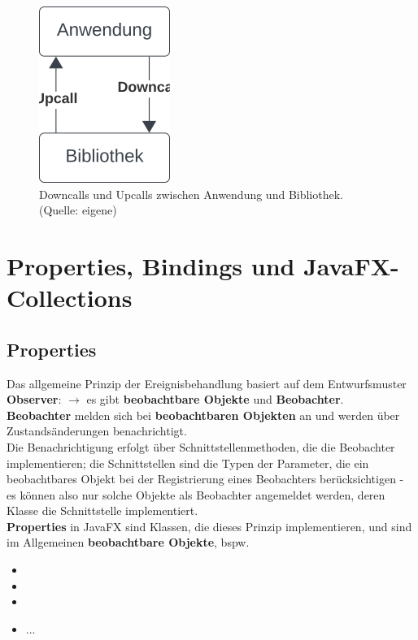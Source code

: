 \begin{figure}
    \centering
    \includegraphics[scale=0.5]{chapters/fopt3/img/javafx/downcallupcall}
    \caption{Downcalls und Upcalls zwischen Anwendung und Bibliothek. (Quelle: eigene)}
    \label{fig:downcallupcall}
\end{figure}

\section{Properties, Bindings und JavaFX-Collections}

\subsection{Properties}

Das allgemeine Prinzip der Ereignisbehandlung basiert auf dem Entwurfsmuster \textbf{Observer}: $\rightarrow$ es gibt \textbf{beobachtbare Objekte} und \textbf{Beobachter}.\\

\noindent
\textbf{Beobachter} melden sich bei \textbf{beobachtbaren Objekten} an und werden über Zustandsänderungen benachrichtigt.\\

\noindent
Die Benachrichtigung erfolgt über Schnittstellenmethoden, die die Beobachter implementieren; die Schnittstellen sind die Typen der Parameter, die ein beobachtbares Objekt bei der Registrierung eines Beobachters berücksichtigen - es können also nur solche Objekte als Beobachter angemeldet werden, deren Klasse die Schnittstelle implementiert.\\

\noindent
\textbf{Properties} in JavaFX sind Klassen, die dieses Prinzip implementieren, und sind im Allgemeinen \textbf{beobachtbare Objekte}, bspw.

\begin{itemize}
    \item {}
    \item {}
    \item {}
    \item {...}
\end{itemize}


